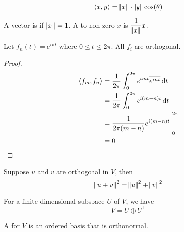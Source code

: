 \begin{definition}
    \begin{equation}
        \left\langle \displaystyle x, y \right\rangle = \norm{x} \cdot \norm{y} \text{cos}(\theta)
    \end{equation}    
\end{definition}


\begin{definition}
	A vector is  if $\norm{x} = 1$. A  to non-zero $x$ is $\dfrac{1}{\norm{x}} x$.
\end{definition}


\begin{theorem}
    Let $f_n (t) = e^{i nt}$ where $0 \leq t \leq 2 \pi$. All $f_i$ are orthogonal.
\end{theorem}
\begin{proof}
    \begin{equation}
        \begin{aligned}
            \innerproduct{f_m}{f_n} &= \frac{1}{2 \pi} \int_0^{2 \pi} e^{imt} \overline{e^{int}} \dif{t} \\
            &= \frac{1}{2\pi} \int_0^{2\pi} e^{i (m-n) t} \dif{t} \\
            &= \eval{\frac{1}{2\pi (m-n)} e^{i(m-n)t}}_0^{2\pi} \\
            &= 0
        \end{aligned}
    \end{equation}
\end{proof}

\begin{theorem}
    Suppose $u$ and $v$ are orthogonal in $V$, then
    \begin{equation}
        \norm{u + v}^2 = \norm{u}^2 + \norm{v}^2
    \end{equation}    
\end{theorem}

\begin{theorem}
    For a finite dimensional subspace $U$ of $V$, we have
    \begin{equation}
        V = U \oplus U^\bot
    \end{equation}        
\end{theorem}



\begin{definition}
	A  for $V$ is an ordered basis that is orthonormal.
\end{definition}

